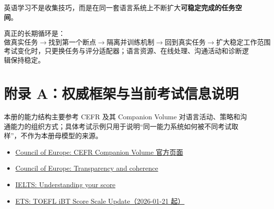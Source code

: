 \documentclass[11pt,a4paper]{ctexart}
\newcommand{\kw}[1]{\textbf{#1}}
\begin{document}
\begin{corebox}[最终心智模型]
英语学习不是收集技巧，而是在同一套语言系统上不断扩大\kw{可稳定完成的任务空间}。

真正的长期循环是：
\[
\boxed{
\text{做真实任务}
\rightarrow
\text{找到第一个断点}
\rightarrow
\text{隔离并训练机制}
\rightarrow
\text{回到真实任务}
\rightarrow
\text{扩大稳定工作范围}
}
\]
考试变化时，只更换任务与评分适配器；语言资源、在线处理、沟通活动和诊断逻辑保持稳定。
\end{corebox}

\section{附录 A：权威框架与当前考试信息说明}
本册的能力结构主要参考 CEFR 及其 Companion Volume 对语言活动、策略和沟通能力的组织方式；具体考试示例只用于说明“同一能力系统如何被不同考试取样”，不作为本册母模型的来源。

\begin{itemize}
  \item \href{https://www.coe.int/en/web/common-european-framework-reference-languages/home}{Council of Europe: CEFR Companion Volume 官方页面}
  \item \href{https://www.coe.int/en/web/common-european-framework-reference-languages/transparency-and-coherence}{Council of Europe: Transparency and coherence}
  \item \href{https://ielts.org/take-a-test/your-results/ielts-scoring-in-detail}{IELTS: Understanding your score}
  \item \href{https://www.ets.org/toefl/institutions/ibt/score-scale-update.html}{ETS: TOEFL iBT Score Scale Update（2026-01-21 起）}
\end{itemize}
\end{document}
